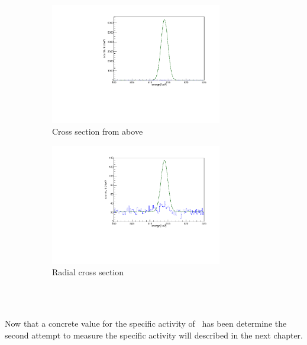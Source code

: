 \documentclass[encoding=utf8,british]{tumphthesis}
\begin{document}
\begin{figure}[t!]
	\centering
	\begin{subfigure}{.5\textwidth}
		\centering
		\includegraphics[width=75mm]{./Bilder/WARP.pdf}
		\caption{Cross section from above}
		\label{fig:WARP}
	\end{subfigure}\hfill%
	\begin{subfigure}{.5\textwidth}
		\centering
		\includegraphics[width=75mm]{./Bilder/Darkside.pdf}
		\caption{Radial cross section}
		\label{fig:Darkside}
	\end{subfigure}
    \\
	\vspace{0.5cm}
    \caption{}
\vspace{0.5cm}
\end{figure}
\\

Now that a concrete value for the specific activity of \Kr\ has been determine the second attempt to measure the specific activity will described in the next chapter.
\\  







\end{document}
